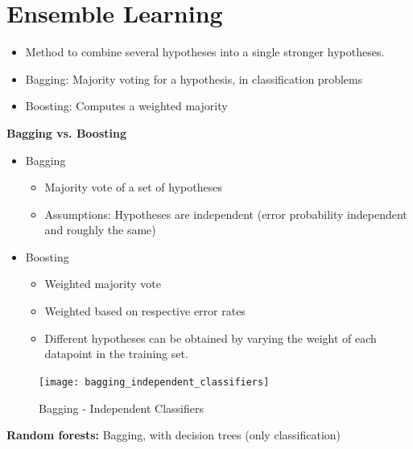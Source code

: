 \documentclass[parskip=half]{scrartcl}
\begin{document}


\newpage


\section{Ensemble Learning} %
\label{sec:ensemble_learning}

    \begin{itemize}
        \item 
        Method to combine several hypotheses into a single stronger hypotheses.
        \item 
        Bagging: Majority voting for a hypothesis, in classification problems
        \item 
        Boosting: Computes a weighted majority
    \end{itemize}

    \textbf{Bagging vs. Boosting}
    \begin{itemize}
        \item 
        Bagging
        \begin{itemize}
            \item 
            Majority vote of a set of hypotheses
            \item
            Assumptions: Hypotheses are independent (error probability independent and roughly the same)
        \end{itemize}
        \item 
        Boosting
        \begin{itemize}
            \item 
            Weighted majority vote
            \item 
            Weighted based on respective error rates
            \item 
            Different hypotheses can be obtained by varying the weight of each datapoint in the training set.
        \end{itemize}
    \end{itemize}

    \begin{figure}[ht]
        \centering
        \texttt{[image: bagging\_independent\_classifiers]}
        \caption{Bagging - Independent Classifiers}
        \label{fig:bagging_independent_classifiers}
    \end{figure}

    \textbf{Random forests:} Bagging, with decision trees (only classification)
\end{document}
